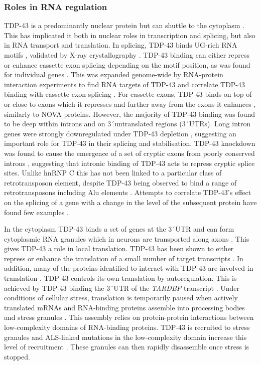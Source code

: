 \subsubsection{Roles in RNA regulation}

TDP-43 is a predominantly nuclear protein but can shuttle to the cytoplasm \citep{Ayala2008}. 
This has implicated it both in nuclear roles in transcription and splicing, but also in RNA transport and translation. 
In splicing, TDP-43 binds UG-rich RNA motifs \citep{Buratti2001a, Buratti2001}, validated by X-ray crystallography \citep{Lukavsky2013}. 
TDP-43 binding can either repress or enhance cassette exon splicing depending on the motif position, as was found for individual genes \citep{Mercado2005-js,Bose2008-du,Shiga2012-it}.
This was expanded genome-wide by RNA-protein interaction experiments to find RNA targets of TDP-43 and correlate TDP-43 binding with cassette exon splicing \citep{Polymenidou2011,Tollervey2011,Kapeli2016}. %
For cassette exons, TDP-43 binds on top of or close to exons which it represses and further away from the exons it enhances \citep{Tollervey2011}, similarly to NOVA proteins.
However, the majority of TDP-43 binding was found to be deep within introns and on 3\'\ untranslated regions (3\'\ UTRs).
Long intron genes were strongly downregulated under TDP-43 depletion \citep{Polymenidou2011}, suggesting an important role for TDP-43 in their splicing and stabilisation. 
TDP-43 knockdown was found to cause the emergence of a set of cryptic exons from poorly conserved introns \citep{Ling2015}, suggesting that intronic binding of TDP-43 acts to repress cryptic splice sites. 
Unlike hnRNP C this has not been linked to a particular class of retrotransposon element, despite TDP-43 being observed to bind a range of retrotransposons including Alu elements \citep{Li2012,Zarnack2013,Kelley2014}.
Attempts to correlate TDP-43's effect on the splicing of a gene with a change in the level of the subsequent protein have found few examples \citep{DeConti2015,Stalekar2015}.

In the cytoplasm TDP-43 binds a set of genes at the 3\'\ UTR \citep{Colombrita2012} and can form cytoplasmic RNA granules which in neurons are transported along axons \citep{Alami2013, Fallini2012}. This gives TDP-43 a role in local translation.
TDP-43 has been shown to either repress or enhance the translation of a small number of target transcripts \citep{Majumder2012, Majumder2016, Neelagandan2018}.
In addition, many of the proteins identified to interact with TDP-43 are involved in translation \citep{Freibaum2010-hw}.
TDP-43 controls its own translation by autoregulation.
This is achieved by TDP-43 binding the 3\'\ UTR of the \textit{TARDBP} transcript \citep{Ayala2011,Koyama2016}. 
Under conditions of cellular stress, translation is temporarily paused when actively translated mRNAs and RNA-binding proteins assemble into processing bodies and stress granules \citep{Anderson2008}. 
This assembly relies on protein-protein interactions between low-complexity domains of RNA-binding proteins.
TDP-43 is recruited to stress granules \citep{Colombrita2009} and ALS-linked mutations in the low-complexity domain increase this level of recruitment \citep{Liu-Yesucevitz2010}.
These granules can then rapidly disassemble once stress is stopped.

